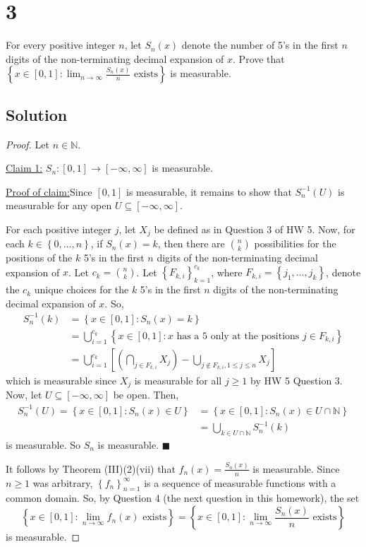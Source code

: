 \documentclass[12pt]{article}
\newenvironment{claimproof}[1]{\par\noindent\underline{Proof of claim:}\space#1}{\hfill $\blacksquare$\vspace{5mm}}
\begin{document}
\newpage 
\section*{3}
For every positive integer $n$, let $S_{n}(x)$ denote the number of 5's in the first $n$ digits of the non-terminating decimal expansion of $x$.
Prove that $\left\{ x \in [0,1] : \lim_{n\rightarrow\infty}\frac{S_{n}(x)}{n}\text{ exists} \right\}$ is measurable.

\subsection*{Solution}

\begin{proof}
Let $n \in \mathbb{N}$.

\underline{Claim 1:} $S_{n} : [0,1] \rightarrow [-\infty, \infty]$ is measurable.
\begin{claimproof}
Since $[0,1]$ is measurable, it remains to show that $S_{n}^{-1}(U)$ is measurable for any open $U \subseteq [-\infty, \infty]$. 

For each positive integer $j$, let $X_{j}$ be defined as in Question 3 of HW 5. Now, for each 
$k \in \left\{ 0, \dots, n \right\}$, if $S_{n}(x) = k$, then there are $\binom{n}{k}$ possibilities for the positions of the $k$ 5's in the first $n$
digits of the non-terminating decimal expansion of $x$. Let $c_{k} = \binom{n}{k}$. Let $\left\{ F_{k,i} \right\}_{k=1}^{c_{k}}$, where $F_{k,i} =
\left\{ j_{1}, \dots, j_{k} \right\}$, denote the $c_{k}$ unique choices for the $k$ 5's in the first $n$ digits of the non-terminating decimal
expansion of $x$. So,
\begin{align*}
S_{n}^{-1}(k) & = \left\{ x \in [0,1] : S_{n}(x) = k \right\} \\
& = \bigcup_{i=1}^{c_{k}}\left\{ x \in [0,1] : x\text{ has a 5 only at the positions }j \in F_{k,i} \right\} \\
& = \bigcup_{i=1}^{c_{k}}\left[  \left(\bigcap_{j\in F_{k,i}}X_{j}\right) - \bigcup_{j \notin F_{k,i}, 1 \leq j \leq n} X_{j} \right]
\end{align*}
which is measurable since $X_{j}$ is measurable for all $j \geq 1$ by HW 5 Question 3. Now, let $U \subseteq [-\infty, \infty]$ be open. Then,
\begin{align*}
S_{n}^{-1}(U) = \left\{ x \in [0,1] : S_{n}(x) \in U \right\} & = \left\{ x \in [0,1] : S_{n}(x) \in U \cap \mathbb{N} \right\} \\
& = \bigcup_{k \in U \cap \mathbb{N}} S_{n}^{-1}(k)
\end{align*}
is measurable. So $S_{n}$ is measurable.
\end{claimproof}

It follows by Theorem (III)(2)(vii) that $f_{n}(x) = \frac{S_{n}(x)}{n}$ is measurable. Since $n \geq 1$ was arbitrary, $\left\{ f_{n}
\right\}_{n=1}^{\infty}$ is a sequence of measurable functions with a common domain. So, by Question 4 (the next question in this homework), the set 
\[ \left\{ x \in [0,1] : \lim_{n\rightarrow\infty}f_{n}(x)\text{ exists} \right\} = \left\{ x \in [0,1] : 
\lim_{n\rightarrow\infty}\frac{S_{n}(x)}{n} \text{ exists}\right\} \]
is measurable.
\end{proof}
\end{document}
